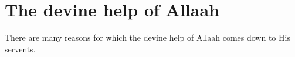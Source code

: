 \chapter{The devine help of Allaah} 

There are many reasons for which the devine help of Allaah comes down to His servents.